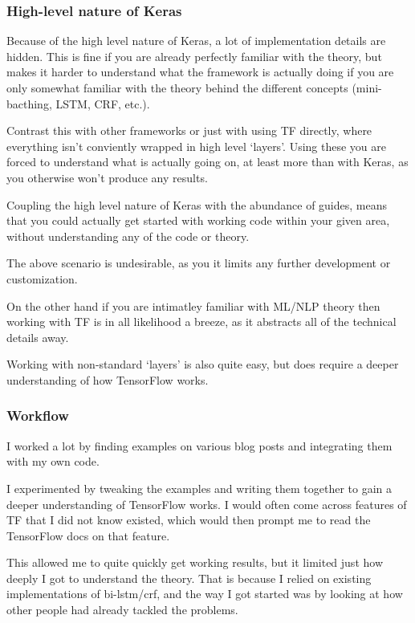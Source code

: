 \subsubsection*{High-level nature of Keras}

Because of the high level nature of Keras, a lot of implementation details are
hidden. This is fine if you are already perfectly familiar with the theory, but
makes it harder to understand what the framework is actually doing if you are
only somewhat familiar with the theory behind the different concepts
(mini-bacthing, LSTM, CRF, etc.).

Contrast this with other frameworks or just with using TF directly, where
everything isn't conviently wrapped in high level `layers'. Using these you are
forced to understand what is actually going on, at least more than with Keras,
as you otherwise won't produce any results.

Coupling the high level nature of Keras with the abundance of guides, means that
you could actually get started with working code within your given area, without
understanding any of the code or theory.

The above scenario is undesirable, as you it limits any further
development or customization.

On the other hand if you are intimatley familiar with ML/NLP theory then
working with TF is in all likelihood a breeze, as it abstracts all of the
technical details away.

Working with non-standard `layers' is also quite easy, but does require a
deeper understanding of how TensorFlow works.

\subsubsection*{Workflow}

I worked a lot by finding examples on various blog posts and integrating them
with my own code.

I experimented by tweaking the examples and writing them together to
gain a deeper understanding of TensorFlow works. I would often come across
features of TF that I did not know existed, which would then prompt me to read
the TensorFlow docs on that feature.

This allowed me to quite quickly get working results, but it limited just how
deeply I got to understand the theory. That is because I relied on existing
implementations of bi-lstm/crf, and the way I got started was by looking at how
other people had already tackled the problems.

